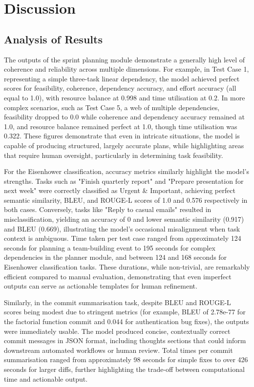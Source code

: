 \documentclass{report}
\begin{document}
\chapter{Discussion} 
\section{Analysis of Results}

The outputs of the sprint planning module demonstrate a generally high level of coherence and reliability across multiple dimensions. For example, in Test Case 1, representing a simple three-task linear dependency, the model achieved perfect scores for feasibility, coherence, dependency accuracy, and effort accuracy (all equal to 1.0), with resource balance at 0.998 and time utilisation at 0.2. In more complex scenarios, such as Test Case 5, a web of multiple dependencies, feasibility dropped to 0.0 while coherence and dependency accuracy remained at 1.0, and resource balance remained perfect at 1.0, though time utilisation was 0.322. These figures demonstrate that even in intricate situations, the model is capable of producing structured, largely accurate plans, while highlighting areas that require human oversight, particularly in determining task feasibility.

For the Eisenhower classification, accuracy metrics similarly highlight the model's strengths. 
Tasks such as "Finish quarterly report" and "Prepare presentation for next week" were correctly classified as Urgent \& Important, achieving perfect semantic similarity, BLEU, and ROUGE-L scores of 1.0 and 0.576 respectively in both cases. 
Conversely, tasks like "Reply to casual emails" resulted in misclassification, yielding an accuracy of 0 and lower semantic similarity (0.917) and BLEU (0.669), illustrating the model's occasional misalignment when task context is ambiguous. 
Time taken per test case ranged from approximately 124 seconds for planning a team-building event to 195 seconds for complex dependencies in the planner module, and between 124 and 168 seconds for Eisenhower classification tasks. 
These durations, while non-trivial, are remarkably efficient compared to manual evaluation, demonstrating that even imperfect outputs can serve as actionable templates for human refinement.

Similarly, in the commit summarisation task, despite BLEU and ROUGE-L scores being modest due to stringent metrics (for example, BLEU of 2.78e-77 for the factorial function commit and 0.044 for authentication bug fixes), the outputs were immediately usable. 
The model produced concise, contextually correct commit messages in JSON format, including thoughts sections that could inform downstream automated workflows or human review. 
Total times per commit summarisation ranged from approximately 98 seconds for simple fixes to over 426 seconds for larger diffs, further highlighting the trade-off between computational time and actionable output.
\end{document}
